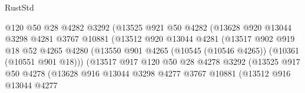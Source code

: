 \begin{lexlean}{RustStd}
\begin{coremodule}
                                  @120
                                  @50
                                  @28
                                  @4282
                                  @3292
                                  (@13525
                                    @921
                                    @50
                                    @4282
                                    (@13628
                                      @920
                                      @13044
                                      @3298
                                      @4281
                                      @3767
                                      @10881
                                      (@13512
                                        @920
                                        @13044
                                        @4281
                                        (@13517
                                          @902
                                          @919
                                          @18
                                          @52
                                          @4265
                                          @4280
                                          (@13550
                                            @901
                                            @4265
                                            (@10545 (@10546 @4265))
                                            (@10361 (@10551 @901 @18)))
                                          (@13517
                                            @917
                                            @120
                                            @50
                                            @28
                                            @4278
                                            @3292
                                            (@13525
                                              @917
                                              @50
                                              @4278
                                              (@13628
                                                @916
                                                @13044
                                                @3298
                                                @4277
                                                @3767
                                                @10881
                                                (@13512
                                                  @916
                                                  @13044
                                                  @4277

\end{coremodule}
\end{lexlean}
